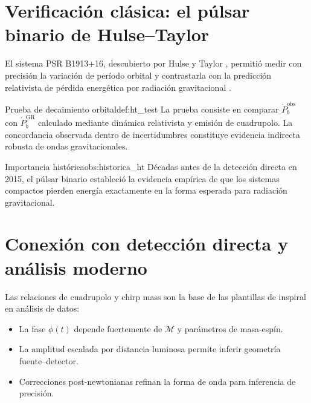 \section{Verificación clásica: el púlsar binario de Hulse--Taylor}
\label{sec:hulse_taylor}

El sistema PSR B1913+16, descubierto por Hulse y Taylor \cite{HulseTaylor1975}, permitió medir con precisión la variación de período orbital y contrastarla con la predicción relativista de pérdida energética por radiación gravitacional \cite{Taylor1982}.

\begin{definicion}{Prueba de decaimiento orbital}{def:ht_test}
La prueba consiste en comparar $\dot P_b^{\mathrm{obs}}$ con $\dot P_b^{\mathrm{GR}}$ calculado mediante dinámica relativista y emisión de cuadrupolo. La concordancia observada dentro de incertidumbres constituye evidencia indirecta robusta de ondas gravitacionales.
\end{definicion}

\begin{observacion}{Importancia histórica}{obs:historica_ht}
Décadas antes de la detección directa en 2015, el púlsar binario estableció la evidencia empírica de que los sistemas compactos pierden energía exactamente en la forma esperada para radiación gravitacional.
\end{observacion}

\section{Conexión con detección directa y análisis moderno}
\label{sec:conexion_lvk}

Las relaciones de cuadrupolo y chirp mass son la base de las plantillas de inspiral en análisis de datos:
\begin{itemize}[leftmargin=2em]
  \item La fase $\phi(t)$ depende fuertemente de $\mathcal{M}$ y parámetros de masa-espín.
  \item La amplitud escalada por distancia luminosa permite inferir geometría fuente--detector.
  \item Correcciones post-newtonianas refinan la forma de onda para inferencia de precisión.
\end{itemize}

